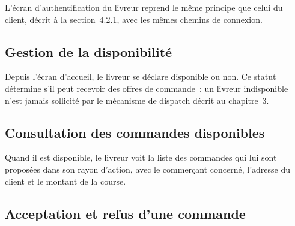 \documentclass[12pt,fleqn,a4paper]{report}
\begin{document}
\begin{justify}
L'écran d'authentification du livreur reprend le même principe que celui du client, décrit à la section~4.2.1, avec les mêmes chemins de connexion.

\subsection{Gestion de la disponibilité}


Depuis l'écran d'accueil, le livreur se déclare disponible ou non. Ce statut détermine s'il peut recevoir des offres de commande~: un livreur indisponible n'est jamais sollicité par le mécanisme de dispatch décrit au chapitre~3.

\subsection{Consultation des commandes disponibles}


Quand il est disponible, le livreur voit la liste des commandes qui lui sont proposées dans son rayon d'action, avec le commerçant concerné, l'adresse du client et le montant de la course.

\subsection{Acceptation et refus d'une commande}



\end{justify}
\end{document}
